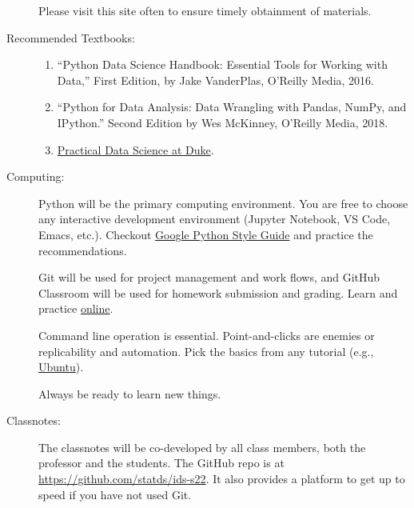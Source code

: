 \documentclass{article}
\let\proglang=\textsf
\begin{document}
\begin{multicols}{2}
\begin{description}
  Please visit this site often to ensure timely obtainment of materials.
  
\item[Recommended Textbooks:]\hspace{0pt}
  \begin{enumerate}
  \item 
    ``Python Data Science Handbook: Essential Tools for Working with
    Data,'' First Edition, by Jake VanderPlas, O’Reilly Media, 2016.
 
  \item
    ``Python for Data Analysis: Data Wrangling with Pandas, NumPy, and
    IPython.''  Second Edition by Wes McKinney, O’Reilly Media, 2018.
  \item
    \href{https://www.practicaldatascience.org/html/not_a_mids_student.html}{Practical
    Data Science at Duke}.
  \end{enumerate}

\item[Computing:]
  \proglang{Python} will be the primary computing environment. You are
  free to choose any interactive development environment (Jupyter
  Notebook, VS Code, Emacs, etc.). Checkout
  \href{https://google.github.io/styleguide/pyguide.html}{Google
    Python Style Guide} and practice the recommendations.

  Git will be used for project management and work flows, and GitHub
  Classroom will be used for homework submission and grading. Learn
  and practice \href{https://gitexercises.fracz.com}{online}.

  Command line operation is essential. Point-and-clicks are enemies or
  replicability and automation. Pick the basics from any tutorial
  (e.g.,
  \href{https://ubuntu.com/tutorials/command-line-for-beginners}{Ubuntu}).

  Always be ready to learn new things.

\item[Classnotes:]
  The classnotes will be co-developed by all class members, both the
  professor and the students. The GitHub repo is at
  \url{https://github.com/statds/ids-s22}.
  It also provides a platform to get up to speed if you have not used Git.
  

\end{description}
\end{multicols}
\end{document}
